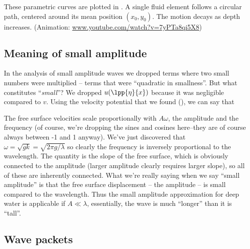 \documentclass[12pt]{book}
\renewcommand{\and}{{\xspace \mathrm{and}\xspace}}
\begin{document}
These parametric curves are plotted in .  A single fluid element follows a circular path, centered around its mean position $(x_0,y_0)$. The motion decays as depth increases. (Animation: \url{www.youtube.com/watch?v=7yPTa8qi5X8})



\subsection{Meaning of small amplitude}
In the analysis of small amplitude waves we dropped terms where two small numbers were multiplied -- terms that were ``quadratic in smallness''.  But what constitutes ``\textit{small}''?  We dropped $u(\lpp{\eta}{x})$ because it was  negligible compared to $v$.  Using the velocity potential that we found (), we can say that
\unnumeq{\abs{u}=\abs{\pp{\phi}{x}}\sim A\omega\qquad\and\qquad \abs{v} = \abs{\pp{\phi}{x}} \sim A\omega. }

The free surface velocities scale proportionally with $A\omega$, the amplitude and the frequency (of course, we're dropping the sines and cosines here--they are of course always between -1 and 1 anyway). We've just discovered that $\omega = \sqrt{gk} = \sqrt{2\pi g/\lambda}$ so clearly the frequency is inversely proportional to the wavelength. The quantity  is the slope of the free surface, which is obviously connected to the amplitude (larger amplitude clearly requires larger slope), so all of these are inherently connected.  What we're really saying when we say ``small amplitude'' is that the free surface displacement -- the amplitude --  is small compared to the wavelength.  Thus the small amplitude approximation for deep water is applicable if $A\ll\lambda$, essentially, the wave is much ``longer'' than it is ``tall''.


\subsection{Wave packets}
\end{document}
